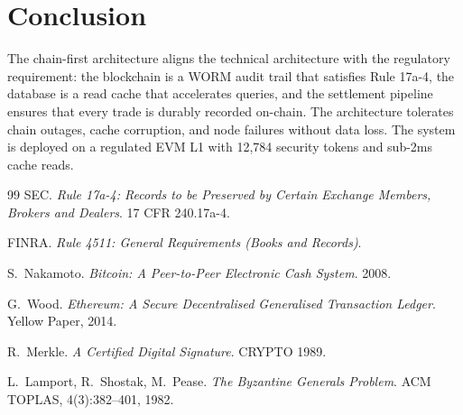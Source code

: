 \section{Conclusion}

\label{sec:conclusion}

The chain-first architecture aligns the technical architecture with
the regulatory requirement: the blockchain is a WORM audit trail that
satisfies Rule 17a-4, the database is a read cache that accelerates
queries, and the settlement pipeline ensures that every trade is
durably recorded on-chain.  The architecture tolerates chain outages,
cache corruption, and node failures without data loss.  The system
is deployed on a regulated EVM L1 with 12,784 security tokens and
sub-2ms cache reads.

\begin{thebibliography}{99}
SEC.
\emph{Rule 17a-4: Records to be Preserved by Certain Exchange Members,
Brokers and Dealers}.
17 CFR 240.17a-4.

FINRA.
\emph{Rule 4511: General Requirements (Books and Records)}.

S.~Nakamoto.
\emph{Bitcoin: A Peer-to-Peer Electronic Cash System}.
2008.

G.~Wood.
\emph{Ethereum: A Secure Decentralised Generalised Transaction Ledger}.
Yellow Paper, 2014.

R.~Merkle.
\emph{A Certified Digital Signature}.
CRYPTO 1989.

L.~Lamport, R.~Shostak, M.~Pease.
\emph{The Byzantine Generals Problem}.
ACM TOPLAS, 4(3):382--401, 1982.
\end{thebibliography}

